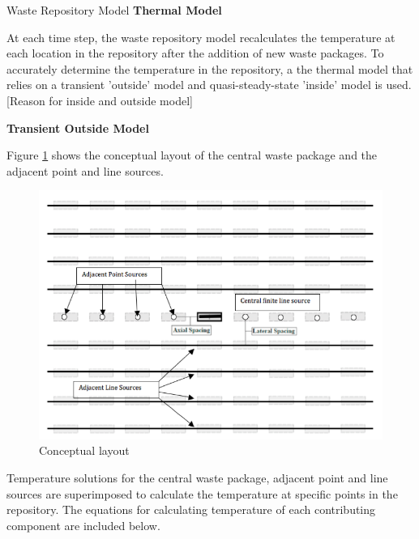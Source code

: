 \documentclass[final]{beamer}
\newlength{\onecolwid}
\newlength{\threecolwid}
\begin{document}
\begin{frame}[t]
\begin{columns}[t,totalwidth=\threecolwid]
\begin{column}{\onecolwid}
\begin{block}{Waste Repository Model}
\textbf{Thermal Model}

At each time step, the waste repository model recalculates the temperature at each 
location in the repository after the addition of new waste packages. 
To accurately determine the temperature in the repository, a the thermal model that 
relies on a transient 'outside' model and quasi-steady-state 'inside' model is used. 
[Reason for inside and outside model]

\textbf{Transient Outside Model}

Figure \ref{fig:conceptual_layout} shows the conceptual layout of the central waste package 
and the adjacent point and line sources. 

\begin{figure}
	\label{fig:conceptual_layout}
	\includegraphics[width=0.9\linewidth]{outsidemodel}
	\caption{Conceptual layout}
\end{figure}

Temperature solutions for the central waste package, adjacent point and line sources 
are superimposed to calculate the temperature at specific points in the repository.
The equations for calculating temperature of each contributing component 
are included below. 


\end{block}
\end{column}
\end{columns}
\end{frame}
\end{document}
